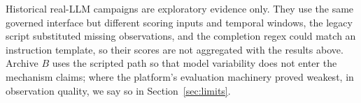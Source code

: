 Historical real-LLM campaigns are exploratory evidence only. They use the same
governed interface but different scoring inputs and temporal windows, the legacy
script substituted missing observations, and the completion regex could match an
instruction template, so their scores are not aggregated with the results above.
Archive $B$ uses the scripted path so that model variability does not enter the
mechanism claims; where the platform's evaluation machinery proved weakest, in
observation quality, we say so in Section~\ref{sec:limits}.
